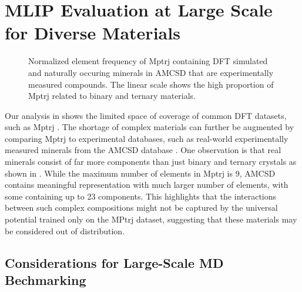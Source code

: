\section{MLIP Evaluation at Large Scale for Diverse Materials} \label{app:sec:mlip-eval}

\begin{figure}
\centering     
{}
 \vspace{-0.40cm}
\caption{Normalized element frequency of Mptrj \citep{deng2023chgnet} containing DFT simulated and naturally occuring minerals in AMCSD \citep{downs2003american} that are experimentally measured compounds. The linear scale shows the high proportion of Mptrj related to binary and ternary materials. }
\label{fig:amcsd_main}
\end{figure}


Our analysis in  shows the limited space of coverage of common DFT datasets, such as Mptrj \citep{deng2023chgnet}. The shortage of complex materials can further be augmented by comparing Mptrj to experimental databases, such as real-world experimentally measured minerals from the AMCSD database \citep{downs2003american}. One observation is that real minerals consist of far more components than just binary and ternary crystals as shown in . While the maximum number of elements in Mptrj is 9, AMCSD contains meaningful representation with much larger number of elements, with some containing up to 23 components. This highlights that the interactions between such complex compositions might not be captured by the universal potential trained only on the MPtrj dataset, suggesting that these materials may be considered out of distribution.


\subsection{Considerations for Large-Scale MD Bechmarking}

